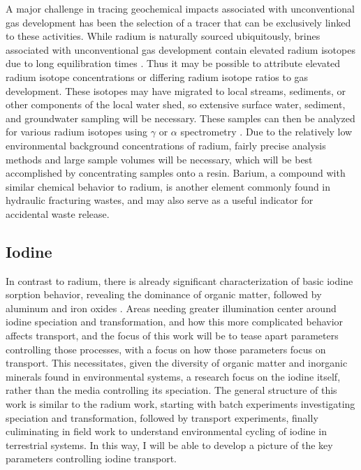\documentclass[twoside,12pt,titlepage]{article}
\begin{document}
\par A major challenge in tracing geochemical impacts associated with unconventional gas development has been the selection of a tracer that can be exclusively linked to these activities. While radium is naturally sourced ubiquitously, brines associated with unconventional gas development contain elevated radium isotopes due to long equilibration times \cite{Barbot2013}. Thus it may be possible to attribute elevated radium isotope concentrations or differing radium isotope ratios to gas development. These isotopes may have migrated to local streams, sediments, or other components of the local water shed, so extensive surface water, sediment, and groundwater sampling will be necessary. These samples can then be analyzed for various radium isotopes using $\gamma$ or $\alpha$ spectrometry \cite{Elsinger1982,Bojanowski2005}. Due to the relatively low environmental background concentrations of radium, fairly precise analysis methods and large sample volumes will be necessary, which will be best accomplished by concentrating samples onto a resin. Barium, a compound with similar chemical behavior to radium, is another element commonly found in hydraulic fracturing wastes, and may also serve as a useful indicator for accidental waste release.

\subsection{Iodine}

In contrast to radium, there is already significant characterization of basic iodine sorption behavior, revealing the dominance of organic matter, followed by aluminum and iron oxides \cite{Kaplan2014}. Areas needing greater illumination center around iodine speciation and transformation, and how this more complicated behavior affects transport, and the focus of this work will be to tease apart parameters controlling those processes, with a focus on how those parameters focus on transport. This necessitates, given the diversity of organic matter and inorganic minerals found in environmental systems, a research focus on the iodine itself, rather than the media controlling its speciation. The general structure of this work is similar to the radium work, starting with batch experiments investigating speciation and transformation, followed by transport experiments, finally culiminating in field work to understand environmental cycling of iodine in terrestrial systems. In this way, I will be able to develop a picture of the key parameters controlling iodine transport.
\end{document}
